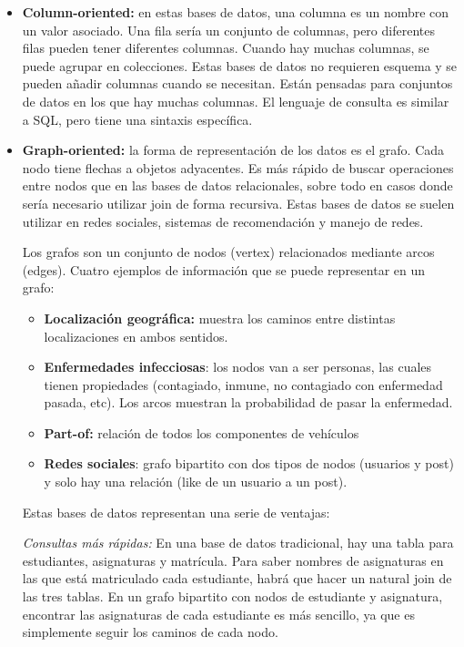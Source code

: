 \begin{itemize}
\item \textbf{Column-oriented:} en estas bases de datos, una columna es un nombre con un valor asociado. Una fila sería un conjunto de columnas, pero diferentes filas pueden tener diferentes columnas. Cuando hay muchas columnas, se puede agrupar en colecciones. Estas bases de datos no requieren esquema y se pueden añadir columnas cuando se necesitan. Están pensadas para conjuntos de datos en los que hay muchas columnas. El lenguaje de consulta es similar a SQL, pero tiene una sintaxis específica.

\item \textbf{Graph-oriented:} la forma de representación de los datos es el grafo. Cada nodo tiene flechas a objetos adyacentes. Es más rápido de buscar operaciones entre nodos que en las bases de datos relacionales, sobre todo en casos donde sería necesario utilizar join de forma recursiva. Estas bases de datos se suelen utilizar en redes sociales, sistemas de recomendación y manejo de redes.

Los grafos son un conjunto de nodos (vertex) relacionados mediante arcos (edges). Cuatro ejemplos de información que se puede representar en un grafo:
\begin{itemize}
\item \textbf{Localización geográfica:} muestra los caminos entre distintas localizaciones en ambos sentidos.
\item \textbf{Enfermedades infecciosas}: los nodos van a ser personas, las cuales tienen propiedades (contagiado, inmune, no contagiado con enfermedad pasada, etc). Los arcos muestran la probabilidad de pasar la enfermedad.
\item \textbf{Part-of:} relación de todos los componentes de vehículos
\item \textbf{Redes sociales}: grafo bipartito con dos tipos de nodos (usuarios y post) y solo hay una relación (like de un usuario a un post).
\end{itemize}

Estas bases de datos representan una serie de ventajas:

\textit{Consultas más rápidas:} En una base de datos tradicional, hay una tabla para estudiantes, asignaturas y matrícula. Para saber nombres de asignaturas en las que está matriculado cada estudiante, habrá que hacer un natural join de las tres tablas. En un grafo bipartito con nodos de estudiante y asignatura, encontrar las asignaturas de cada estudiante es más sencillo, ya que es simplemente seguir los caminos de cada nodo. 


\end{itemize}
